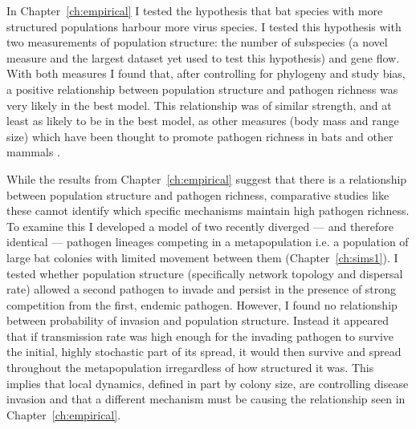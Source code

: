 


In Chapter~\ref{ch:empirical} I tested the hypothesis that bat species with more structured populations harbour more virus species.
I tested this hypothesis with two measurements of population structure: the number of subspecies (a novel measure and the largest dataset yet used to test this hypothesis) and gene flow.
With both measures I found that, after controlling for phylogeny and study bias, a positive relationship between population structure and pathogen richness was very likely in the best model.
This relationship was of similar strength, and at least as likely to be in the best model, as other measures (body mass and range size) which have been thought to promote pathogen richness in bats and other mammals \cite{kamiya2014determines, arneberg2002host, gay2014parasite, nunn2003comparative, turmelle2009correlates}.




While the results from Chapter~\ref{ch:empirical} suggest that there is a relationship between population structure and pathogen richness, comparative studies like these cannot identify which specific mechanisms maintain high pathogen richness.
To examine this I developed a model of two recently diverged --- and therefore identical --- pathogen lineages competing in a metapopulation i.e. a population of large bat colonies with limited movement between them (Chapter~\ref{ch:sims1}). 
I tested whether population structure (specifically network topology and dispersal rate) allowed a second pathogen to invade and persist in the presence of strong competition from the first, endemic pathogen.
However, I found no relationship between probability of invasion and population structure.
Instead it appeared that if transmission rate was high enough for the invading pathogen to survive the initial, highly stochastic part of its spread, it would then survive and spread throughout the metapopulation irregardless of how structured it was.
This implies that local dynamics, defined in part by colony size, are controlling disease invasion and that a different mechanism must be causing the relationship seen in Chapter~\ref{ch:empirical}.


